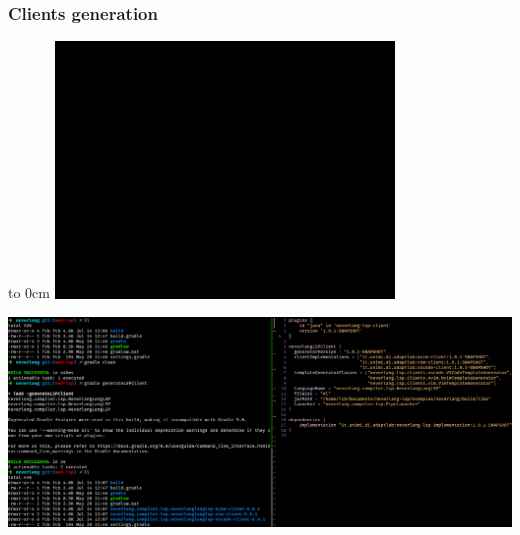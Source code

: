 \documentclass[9pt,xcolor=table,svgnames]{beamer}
\begin{document}
\begin{frame}[noframenumbering]
    \frametitle{Clients generation}

    {\hspace*{6cm}\vbox to 0cm {\vspace*{4cm}\includegraphics[width=9cm]{./figs/black_rect.png}}}
    \begin{center}
        \includegraphics[width=1\textwidth]{imgs/clients_generation.png}
    \end{center}

\end{frame}
\endgroup
\end{document}
